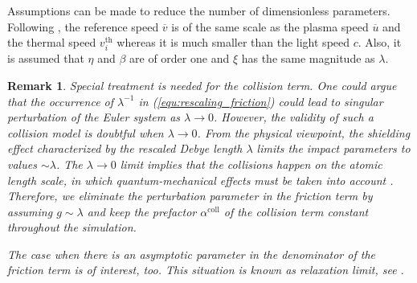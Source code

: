 \documentclass{article}
\newtheorem*{remark}{Remark}
\begin{document}
Assumptions can be made to reduce the number of dimensionless parameters. Following
\cite[][Sec.~2.2]{degond_2017}, the reference speed $\overline{v}$ is of the same scale as
the plasma speed $\overline{u}$ and the thermal speed $v_i^{\text{th}}$ whereas it is much
smaller than the light speed $c$. Also, it is assumed that $\eta$ and $\beta$ are of order
one and $\xi$ has the same magnitude as $\lambda$.

\begin{remark}
Special treatment is needed for the collision term. One could argue that the occurrence of
$\lambda^{-1}$ in (\ref{equ:rescaling_friction}) could lead to singular perturbation of
the Euler system as $\lambda \rightarrow 0$. However, the validity of such a collision
model is doubtful when $\lambda \rightarrow 0$. From the physical viewpoint, the shielding
effect characterized by the rescaled Debye length $\lambda$ limits the impact parameters
to values $\sim\lambda$. The $\lambda \rightarrow 0$ limit implies that the collisions
happen on the atomic length scale, in which quantum-mechanical effects must be taken into
account \cite[][pp. 144-148]{frank_1972}. Therefore, we eliminate the perturbation
parameter in the friction term by assuming $g \sim \lambda$ and keep the prefactor
$\alpha^{\text{coll}}$ of the collision term constant throughout the simulation.

The case when there is an asymptotic parameter in the denominator of the friction term is
of interest, too. This situation is known as relaxation limit, see \cite{peng_2011,
  wasiolek_2016, Li_2021, Chen_2000}.
\end{remark}
\end{document}
